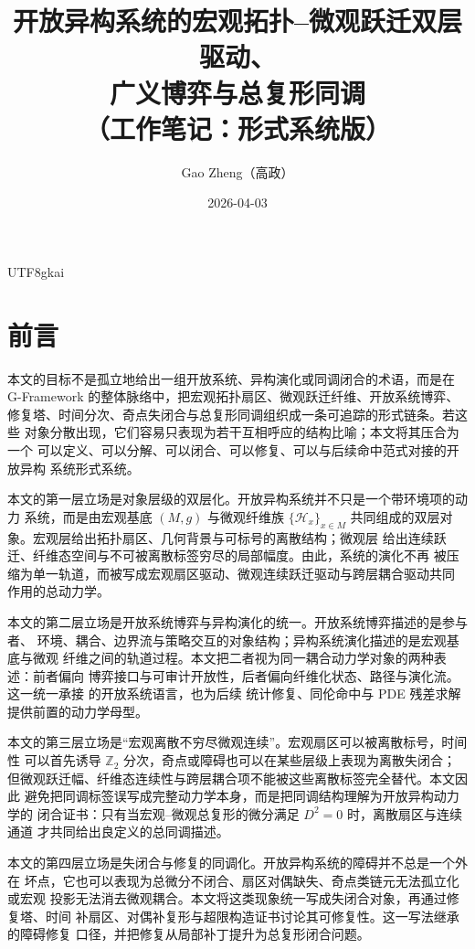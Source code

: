 \documentclass[12pt]{article}
\newcommand{\Ztwo}{\mathbb{Z}_2}
\newcommand{\GFramework}{\textsf{G-Framework}}
\begin{document}
\begin{CJK*}{UTF8}{gkai}

\title{开放异构系统的宏观拓扑--微观跃迁双层驱动、\\广义博弈与总复形同调\\（工作笔记：形式系统版）}
\author{Gao Zheng（高政）}
\date{2026-04-03}
\maketitle

\section*{前言}

本文的目标不是孤立地给出一组开放系统、异构演化或同调闭合的术语，而是在
\GFramework{} 的整体脉络中，把宏观拓扑扇区、微观跃迁纤维、开放系统博弈、
修复塔、时间分次、奇点失闭合与总复形同调组织成一条可追踪的形式链条。若这些
对象分散出现，它们容易只表现为若干互相呼应的结构比喻；本文将其压合为一个
可以定义、可以分解、可以闭合、可以修复、可以与后续命中范式对接的开放异构
系统形式系统。

本文的第一层立场是对象层级的双层化。开放异构系统并不只是一个带环境项的动力
系统，而是由宏观基底 \((M,g)\) 与微观纤维族 \(\{\mathcal H_x\}_{x\in M}\)
共同组成的双层对象。宏观层给出拓扑扇区、几何背景与可标号的离散结构；微观层
给出连续跃迁、纤维态空间与不可被离散标签穷尽的局部幅度。由此，系统的演化不再
被压缩为单一轨道，而被写成宏观扇区驱动、微观连续跃迁驱动与跨层耦合驱动共同
作用的总动力学。

本文的第二层立场是开放系统博弈与异构演化的统一。开放系统博弈描述的是参与者、
环境、耦合、边界流与策略交互的对象结构；异构系统演化描述的是宏观基底与微观
纤维之间的轨道过程。本文把二者视为同一耦合动力学对象的两种表述：前者偏向
博弈接口与可审计开放性，后者偏向纤维化状态、路径与演化流。这一统一承接
\cite{RepoTex23OpenSystemGame,RepoTex39StatRepair} 的开放系统语言，也为后续
统计修复、同伦命中与 PDE 残差求解提供前置的动力学母型。

本文的第三层立场是“宏观离散不穷尽微观连续”。宏观扇区可以被离散标号，时间性
可以首先诱导 \(\Ztwo\) 分次，奇点或障碍也可以在某些层级上表现为离散失闭合；
但微观跃迁幅、纤维态连续性与跨层耦合项不能被这些离散标签完全替代。本文因此
避免把同调标签误写成完整动力学本身，而是把同调结构理解为开放异构动力学的
闭合证书：只有当宏观--微观总复形的微分满足 \(D^2=0\) 时，离散扇区与连续通道
才共同给出良定义的总同调描述。

本文的第四层立场是失闭合与修复的同调化。开放异构系统的障碍并不总是一个外在
坏点，它也可以表现为总微分不闭合、扇区对偶缺失、奇点类链元无法孤立化或宏观
投影无法消去微观耦合。本文将这类现象统一写成失闭合对象，再通过修复塔、时间
补扇区、对偶补复形与超限构造证书讨论其可修复性。这一写法继承
\cite{RepoTex38JacobiBianchiRepair,RepoTex29RepairableObstruction} 的障碍修复
口径，并把修复从局部补丁提升为总复形闭合问题。


\end{CJK*}
\end{document}
